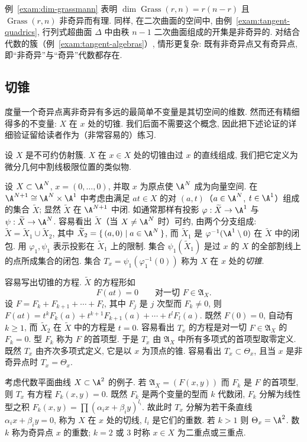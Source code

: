 例~\ref{exam:dim-grassmann} 表明 $\dim \operatorname{Grass}(r,n) = r(n-r)$ 且 $\operatorname{Grass}(r,n)$ 非奇异而有理. 同样, 在二次曲面的空间中, 由例~\ref{exam:tangent-quadrics}, 行列式超曲面 $\Delta$ 中由秩 $n-1$ 二次曲面组成的开集是非奇异的. 对结合代数的簇（例~\ref{exam:tangent-algebras}）, 情形更复杂: 既有非奇异点又有奇异点, 即``非奇异''与``奇异''代数都存在.

\subsection{切锥}

度量一个奇异点离非奇异有多远的最简单不变量是其切空间的维数. 然而还有精细得多的不变量: $X$ 在 $x$ 处的切锥. 我们后面不需要这个概念, 因此把下述论证的详细验证留给读者作为（非常容易的）练习.

设 $X$ 是不可约仿射簇. $X$ 在 $x \in X$ 处的切锥由过 $x$ 的直线组成, 我们把它定义为微分几何中割线极限位置的类似物.

设 $X \subset \A^N$, $x = (0, \ldots, 0)$, 并取 $x$ 为原点使 $\A^N$ 成为向量空间. 在 $\A^{N+1} \cong \A^N \times \A^1$ 中考虑由满足 $at \in X$ 的对 $(a, t)$（$a \in \A^N$, $t \in \A^1$）组成的集合 $\widetilde X$; 显然 $\widetilde X$ 在 $\A^{N+1}$ 中闭. 如通常那样有投影 $\varphi: \widetilde X \to \A^1$ 与 $\psi: \widetilde X \to \A^N$. 容易看出 $\widetilde X$（当 $X \ne \A^N$ 时）可约, 由两个分支组成: $\widetilde X = \widetilde X_1 \cup \widetilde X_2$, 其中 $\widetilde X_2 = \{\, (a, 0) \mid a \in \A^N \,\}$, 而 $\widetilde X_1$ 是 $\varphi^{-1}(\A^1 \setminus 0)$ 在 $\widetilde X$ 中的闭包. 用 $\varphi_1, \psi_1$ 表示投影在 $\widetilde X_1$ 上的限制. 集合 $\psi_1(\widetilde X_1)$ 是过 $x$ 的 $X$ 的全部割线上的点所成集合的闭包. 集合 $T_x = \psi_1(\varphi_1^{-1}(0))$ 称为 $X$ 在 $x$ 处的\emph{切锥}.

容易写出切锥的方程. $\widetilde X$ 的方程形如
\[
	F(at) = 0 \qquad \text{对一切 } F \in \mathfrak A_X.
\]
设 $F = F_k + F_{k+1} + \cdots + F_l$, 其中 $F_j$ 是 $j$ 次型而 $F_k \ne 0$, 则 $F(at) = t^k F_k(a) + t^{k+1} F_{k+1}(a) + \cdots + t^l F_l(a)$. 既然 $F(0) = 0$, 自动有 $k \ge 1$, 而 $\widetilde X_2$ 在 $\widetilde X$ 中的方程是 $t = 0$. 容易看出 $T_x$ 的方程是对一切 $F \in \mathfrak A_X$ 的 $F_k = 0$. 型 $F_k$ 称为 $F$ 的首项型. 于是 $T_x$ 由 $\mathfrak A_X$ 中所有多项式的首项型取零定义. 既然 $T_x$ 由齐次多项式定义, 它是以 $x$ 为顶点的锥. 容易看出 $T_x \subset \Theta_x$, 且当 $x$ 是非奇异点时 $T_x = \Theta_x$.

考虑代数平面曲线 $X \subset \A^2$ 的例子. 若 $\mathfrak A_X = (F(x,y))$ 而 $F_k$ 是 $F$ 的首项型, 则 $T_x$ 有方程 $F_k(x,y) = 0$. 既然 $F_k$ 是两个变量的型而 $k$ 代数闭, $F_k$ 分解为线性型之积 $F_k(x,y) = \prod (\alpha_i x + \beta_i y)^{l_i}$. 故此时 $T_x$ 分解为若干条直线 $\alpha_i x + \beta_i y = 0$, 称为 $X$ 在 $x$ 处的切线, $l_i$ 是它们的重数. 若 $k > 1$ 则 $\Theta_x = \A^2$. 数 $k$ 称为奇异点 $x$ 的重数; $k = 2$ 或 $3$ 时称 $x \in X$ 为二重点或三重点.

